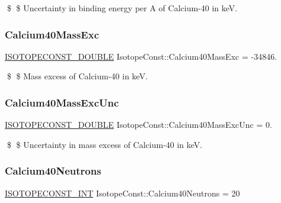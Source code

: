 \$ \$ Uncertainty in binding energy per A of Calcium-\/40 in keV. \mbox{\label{group___isotope_const-_calcium-_ca40_ga1d5a467a09d61b43cd91f2252be3d392}} 
\subsubsection{\texorpdfstring{Calcium40\+Mass\+Exc}{Calcium40MassExc}}
{\footnotesize\ttfamily \mbox{\hyperlink{group___isotope_const-_macros_ga8f45a7272ce02c0b4c65c44636ed719a}{I\+S\+O\+T\+O\+P\+E\+C\+O\+N\+S\+T\+\_\+\+D\+O\+U\+B\+LE}} Isotope\+Const\+::\+Calcium40\+Mass\+Exc = -\/34846.}

\$ \$ Mass excess of Calcium-\/40 in keV. \mbox{\label{group___isotope_const-_calcium-_ca40_gae2b8902c43866d27c95ef455ad59b868}} 
\subsubsection{\texorpdfstring{Calcium40\+Mass\+Exc\+Unc}{Calcium40MassExcUnc}}
{\footnotesize\ttfamily \mbox{\hyperlink{group___isotope_const-_macros_ga8f45a7272ce02c0b4c65c44636ed719a}{I\+S\+O\+T\+O\+P\+E\+C\+O\+N\+S\+T\+\_\+\+D\+O\+U\+B\+LE}} Isotope\+Const\+::\+Calcium40\+Mass\+Exc\+Unc = 0.}

\$ \$ Uncertainty in mass excess of Calcium-\/40 in keV. \mbox{\label{group___isotope_const-_calcium-_ca40_ga3960d94a6b2493802536466a374dfe0c}} 
\subsubsection{\texorpdfstring{Calcium40\+Neutrons}{Calcium40Neutrons}}
{\footnotesize\ttfamily \mbox{\hyperlink{group___isotope_const-_macros_ga5f18360b3e99483a35c32d789e62621c}{I\+S\+O\+T\+O\+P\+E\+C\+O\+N\+S\+T\+\_\+\+I\+NT}} Isotope\+Const\+::\+Calcium40\+Neutrons = 20}

